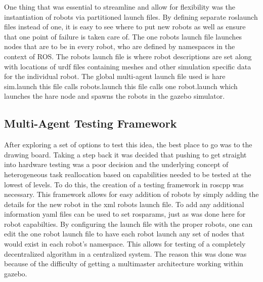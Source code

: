 One thing that was essential to streamline and allow for flexibility was the instantiation of robots via partitioned
launch files. By defining separate roslaunch files instead of one, it is easy to see where to
put new robots as well as ensure that one point of failure is taken care of.
The one robots launch file launches nodes that are to be in every robot,
who are defined by namespaces in the context of ROS. The robots launch file is where robot descriptions
are set along with locations of urdf files containing meshes and other simulation specific
data for the individual robot. The global multi-agent launch file used is hare sim.launch this file calls robots.launch this file calls one robot.launch which launches the hare node and spawns the robots in the gazebo simulator.


\subsection{Multi-Agent Testing Framework}
After exploring a set of options to test this idea, the best place to go was to the drawing
board. Taking a step back it was decided that pushing to get straight into hardware testing
was a poor decision and the underlying concept of heterogeneous task reallocation based on
capabilities needed to be tested at the lowest of levels. To do this, the creation of a testing
framework in roscpp was necessary. This framework allows for easy addition of robots by simply
adding the details for the new robot in the xml robots launch file. To add any additional information
yaml files can be used to set rosparams, just as was done here for robot capabilties. By configuring
the launch file with the proper robots, one can edit the one robot launch file to have each robot launch
any set of nodes that would exist in each robot's namespace. This allows for testing of a completely
decentralized algorithm in a centralized system. The reason this was done was because of the difficulty
of getting a multimaster architecture working within gazebo.
